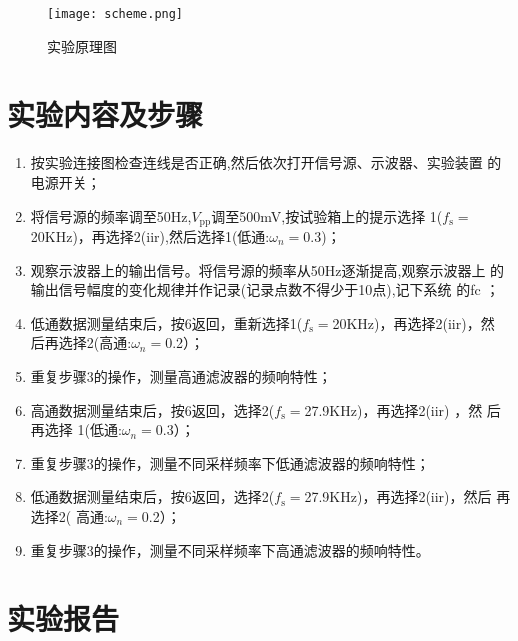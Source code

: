 \documentclass[../main]{subfiles}
\begin{document}
\begin{figure}[htbp]
	\centering
	\texttt{[image: scheme.png]}
	\caption{实验原理图}
	\label{fig:实验原理图}
\end{figure}

\section{实验内容及步骤}%
\label{sec:\arabic{chapter}实验内容及步骤}

\begin{enumerate}

	\item 按实验连接图检查连线是否正确,然后依次打开信号源、示波器、实验装置
		的电源开关；

	\item 将信号源的频率调至50Hz,$ V_\mathrm{pp}$调至500mV,按试验箱上的提示选择
		1($ f_\mathrm{s} = $20KHz)，再选择2(iir),然后选择1(低通:$ \omega_n = $0.3)；

	\item 观察示波器上的输出信号。将信号源的频率从50Hz逐渐提高,观察示波器上
		的输出信号幅度的变化规律并作记录(记录点数不得少于10点),记下系统
		的fc ；

	\item 低通数据测量结束后，按6返回，重新选择1($ f_\mathrm{s} = $20KHz)，再选择2(iir)，然
		后再选择2(高通:$ \omega_n = $0.2）；

	\item 重复步骤3的操作，测量高通滤波器的频响特性；

	\item 高通数据测量结束后，按6返回，选择2($ f_\mathrm{s} = $27.9KHz)，再选择2(iir) ，然
		后再选择 1(低通:$ \omega_n = $0.3）；

	\item 重复步骤3的操作，测量不同采样频率下低通滤波器的频响特性；

	\item 低通数据测量结束后，按6返回，选择2($ f_\mathrm{s} = $27.9KHz)，再选择2(iir)，然后
		再选择2( 高通:$ \omega_n = $0.2）；

	\item 重复步骤3的操作，测量不同采样频率下高通滤波器的频响特性。

\end{enumerate}

\section{实验报告}%
\label{sec:\arabic{chapter}实验报告}
\end{document}
